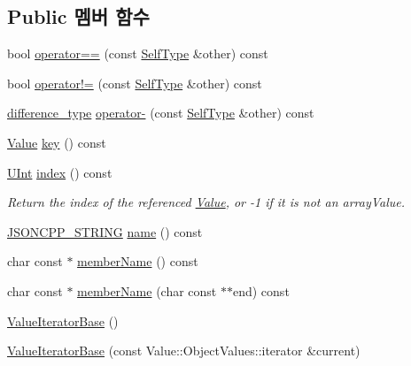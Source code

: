 \subsection*{Public 멤버 함수}
\begin{DoxyCompactItemize}
\item 
bool \hyperlink{class_json_1_1_value_iterator_base_a1248d8016f88b51371a0fcbd355b3cfd}{operator==} (const \hyperlink{class_json_1_1_value_iterator_base_a9d2a940d03ea06d20d972f41a89149ee}{Self\+Type} \&other) const
\item 
bool \hyperlink{class_json_1_1_value_iterator_base_aa83bdcc8114b7d040eb8eb42eeed5f4a}{operator!=} (const \hyperlink{class_json_1_1_value_iterator_base_a9d2a940d03ea06d20d972f41a89149ee}{Self\+Type} \&other) const
\item 
\hyperlink{class_json_1_1_value_iterator_base_a4e44bf8cbd17ec8d6e2c185904a15ebd}{difference\+\_\+type} \hyperlink{class_json_1_1_value_iterator_base_a98e254263fca5f1fc8fcac7bcb0260bf}{operator-\/} (const \hyperlink{class_json_1_1_value_iterator_base_a9d2a940d03ea06d20d972f41a89149ee}{Self\+Type} \&other) const
\item 
\hyperlink{class_json_1_1_value}{Value} \hyperlink{class_json_1_1_value_iterator_base_a3838ba39c43c518cf3ed4aa6ce78ccad}{key} () const
\item 
\hyperlink{namespace_json_a800fb90eb6ee8d5d62b600c06f87f7d4}{U\+Int} \hyperlink{class_json_1_1_value_iterator_base_a549c66a0bd20e9ae772175a5c0d2e88a}{index} () const
\begin{DoxyCompactList}\small\item\em Return the index of the referenced \hyperlink{class_json_1_1_value}{Value}, or -\/1 if it is not an array\+Value. \end{DoxyCompactList}\item 
\hyperlink{json_8h_a1e723f95759de062585bc4a8fd3fa4be}{J\+S\+O\+N\+C\+P\+P\+\_\+\+S\+T\+R\+I\+NG} \hyperlink{class_json_1_1_value_iterator_base_a522989403c976fdbb94da846b99418db}{name} () const
\item 
char const  $\ast$ \hyperlink{class_json_1_1_value_iterator_base_a54765da6759fd3f1edcbfbaf308ec263}{member\+Name} () const
\item 
char const  $\ast$ \hyperlink{class_json_1_1_value_iterator_base_a391c9cbd0edf9a447b37df00e8ce6059}{member\+Name} (char const $\ast$$\ast$end) const
\item 
\hyperlink{class_json_1_1_value_iterator_base_af45b028d9ff9cbd2554a87878b42dd75}{Value\+Iterator\+Base} ()
\item 
\hyperlink{class_json_1_1_value_iterator_base_a640e990e5f03a96fd650122a2906f59d}{Value\+Iterator\+Base} (const Value\+::\+Object\+Values\+::iterator \&current)
\end{DoxyCompactItemize}
